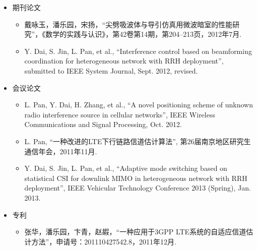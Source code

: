 
\begin{Resume}
    \begin{itemize}
        \item 期刊论文
            \begin{itemize}
                \item 戴咏玉，潘乐园，宋扬，“尖劈吸波体与导引仿真用微波暗室的性能研究”，《数学的实践与认识》，第42卷第14期，第204--213页，2012年7月.
                \item Y. Dai, S. Jin, L. Pan, et al., ``Interference control based on beamforming coordination for heterogeneous network with RRH deployment'', submitted to IEEE System Journal, Sept. 2012, revised.
            \end{itemize}
        \item 会议论文
            \begin{itemize}
                \item L. Pan, Y. Dai, H. Zhang, et al., ``A novel positioning scheme of unknown radio interference source in cellular networks'', IEEE Wireless Communications and Signal Processing, Oct. 2012.
                \item L. Pan, ``一种改进的LTE下行链路信道估计算法'', 第26届南京地区研究生通信年会，2011年11月.
                \item Y. Dai, S. Jin, L. Pan, et al., ``Adaptive mode switching based on statistical CSI for downlink MIMO in heterogeneous network with RRH deployment'', IEEE Vehicular Technology Conference 2013 (Spring), Jan. 2013.
            \end{itemize}
        \item 专利
            \begin{itemize}
                \item 张华，潘乐园，卞青，赵嘏，“一种应用于3GPP LTE系统的自适应信道估计方法”，申请号：201110427542.8，2011年12月.
            \end{itemize}
    \end{itemize}
\end{Resume}
